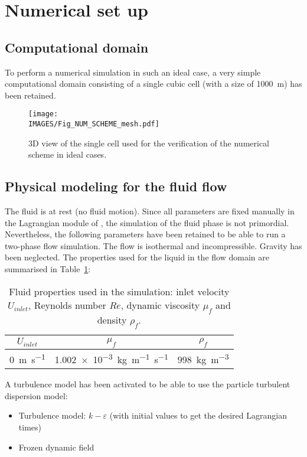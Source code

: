 \section{Numerical set up}
\subsection{Computational domain}
To perform a numerical simulation in such an ideal case, a very simple computational domain consisting of a single cubic cell (with a size of \SI{1000}{m}) has been retained.

\begin{figure}[H]
 \centering
 \texttt{[image: \\IMAGES/Fig\_NUM\_SCHEME\_mesh.pdf]}
 \caption{3D view of the single cell used for the verification of the numerical scheme in ideal cases.}
 \label{Fig_NUM_SCHEME_Verif_mesh}
\end{figure}

%
\subsection{Physical modeling for the fluid flow}
The fluid is at rest (no fluid motion).
Since all parameters are fixed manually in the Lagrangian module of \CS{}, the simulation of the fluid phase is not primordial. Nevertheless, the following parameters have been retained to be able to run a two-phase flow simulation. The flow is isothermal and incompressible. Gravity has been neglected. The properties used for the liquid in the flow domain are summarised in Table~\ref{Tab_NUM_SCHEME_fluid}:
\begin{table}[H]
\begin{center}
\begin{tabular}{|c|c|c|}
\hline
$U_{inlet}$ & $\mu_f$ 			& $\rho_f$ 		\\
\hline
\SI{0}{m.s^{-1}} & \SI{1.002e-3}{kg.m^{-1}.s^{-1}} 	& \SI{998}{kg.m^{-3}}	\\
\hline
\end{tabular}
 \caption{Fluid properties used in the simulation: inlet velocity $U_{inlet}$, Reynolds number $Re$, dynamic viscosity $\mu_f$ and density $\rho_f$.}
\label{Tab_NUM_SCHEME_fluid}
\end{center}
\end{table}

A turbulence model has been activated to be able to use the particle turbulent dispersion model:
\begin{itemize}
 \item Turbulence model: $k-\varepsilon$ (with initial values to get the desired Lagrangian times)
 \item Frozen dynamic field
\end{itemize}

